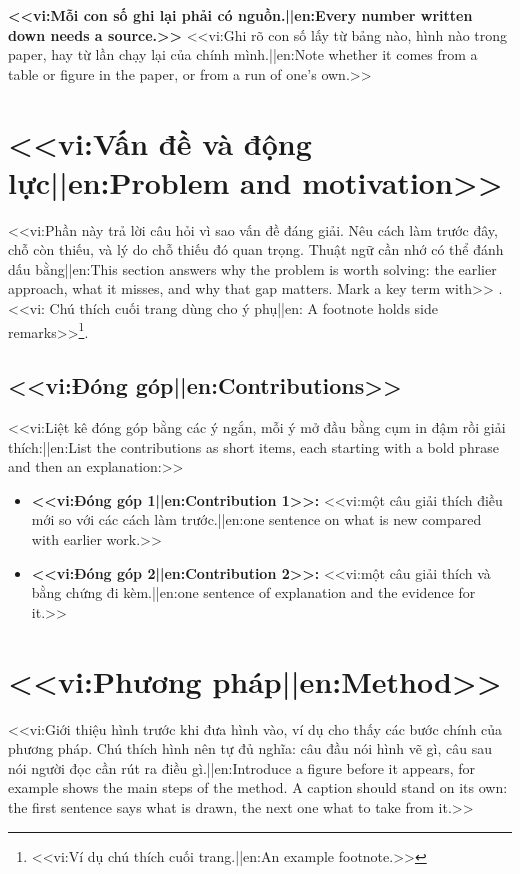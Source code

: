 \documentclass[12pt,a4paper]{article}
\begin{document}
\begin{keyidea}
\textbf{<<vi:Mỗi con số ghi lại phải có nguồn.||en:Every number written down needs a source.>>} <<vi:Ghi rõ con số lấy từ bảng nào, hình nào trong paper, hay từ lần chạy lại của chính mình.||en:Note whether it comes from a table or figure in the paper, or from a run of one's own.>>
\end{keyidea}

\section{<<vi:Vấn đề và động lực||en:Problem and motivation>>}
<<vi:Phần này trả lời câu hỏi vì sao vấn đề đáng giải. Nêu cách làm trước đây, chỗ còn thiếu, và lý do chỗ thiếu đó quan trọng. Thuật ngữ cần nhớ có thể đánh dấu bằng||en:This section answers why the problem is worth solving: the earlier approach, what it misses, and why that gap matters. Mark a key term with>> .<<vi: Chú thích cuối trang dùng cho ý phụ||en: A footnote holds side remarks>>\footnote{<<vi:Ví dụ chú thích cuối trang.||en:An example footnote.>>}.

\subsection{<<vi:Đóng góp||en:Contributions>>}
<<vi:Liệt kê đóng góp bằng các ý ngắn, mỗi ý mở đầu bằng cụm in đậm rồi giải thích:||en:List the contributions as short items, each starting with a bold phrase and then an explanation:>>
\begin{itemize}
  \item \textbf{<<vi:Đóng góp 1||en:Contribution 1>>:} <<vi:một câu giải thích điều mới so với các cách làm trước.||en:one sentence on what is new compared with earlier work.>>
  \item \textbf{<<vi:Đóng góp 2||en:Contribution 2>>:} <<vi:một câu giải thích và bằng chứng đi kèm.||en:one sentence of explanation and the evidence for it.>>
\end{itemize}

\section{<<vi:Phương pháp||en:Method>>}
<<vi:Giới thiệu hình trước khi đưa hình vào, ví dụ  cho thấy các bước chính của phương pháp. Chú thích hình nên tự đủ nghĩa: câu đầu nói hình vẽ gì, câu sau nói người đọc cần rút ra điều gì.||en:Introduce a figure before it appears, for example  shows the main steps of the method. A caption should stand on its own: the first sentence says what is drawn, the next one what to take from it.>>
\end{document}
